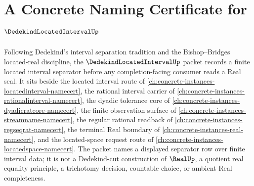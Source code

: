 \chapter{A Concrete Naming Certificate for $\DedekindLocatedIntervalUp$}
\label{ch:concrete-instances-dedekind-located-interval-namecert}

Following Dedekind's interval separation tradition and the Bishop--Bridges located-real discipline, the $\DedekindLocatedIntervalUp$ packet records a finite located interval separator before any completion-facing consumer reads a Real seal. It sits beside the located interval route of \autoref{ch:concrete-instances-locatedinterval-namecert}, the rational interval carrier of \autoref{ch:concrete-instances-rationalinterval-namecert}, the dyadic tolerance core of \autoref{ch:concrete-instances-dyadicratcore-namecert}, the finite observation surface of \autoref{ch:concrete-instances-streamname-namecert}, the regular rational readback of \autoref{ch:concrete-instances-regseqrat-namecert}, the terminal Real boundary of \autoref{ch:concrete-instances-real-namecert}, and the located-space request route of \autoref{ch:concrete-instances-locatedspace-namecert}. The packet names a displayed separator row over finite interval data; it is not a Dedekind-cut construction of $\RealUp$, a quotient real equality principle, a trichotomy decision, countable choice, or ambient Real completeness.

